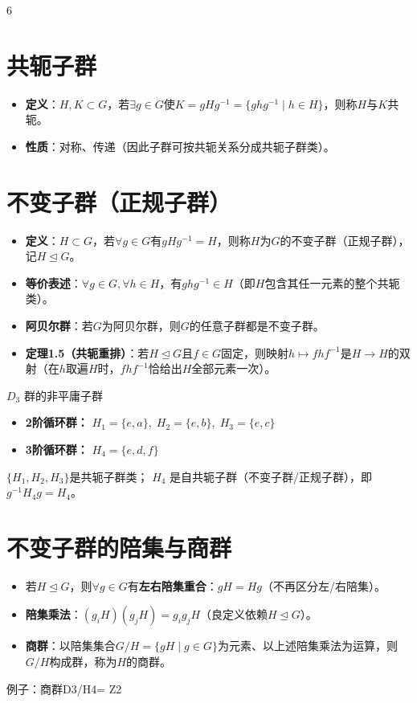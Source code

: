 \documentclass[landscape]{article}
\begin{document}
\begin{multicols*}{6}
\section*{共轭子群}
\begin{itemize}
  \item \textbf{定义}：$H,K\subset G$，若$\exists g\in G$使$K=gHg^{-1}=\{ghg^{-1}\mid h\in H\}$，则称$H$与$K$共轭。
  \item \textbf{性质}：对称、传递（因此子群可按共轭关系分成共轭子群类）。
\end{itemize}

\section*{不变子群（正规子群）}
\begin{itemize}
  \item \textbf{定义}：$H\subset G$，若$\forall g\in G$有$gHg^{-1}=H$，则称$H$为$G$的不变子群（正规子群），记$H\trianglelefteq G$。
  \item \textbf{等价表述}：$\forall g\in G,\forall h\in H$，有$ghg^{-1}\in H$（即$H$包含其任一元素的整个共轭类）。
  \item \textbf{阿贝尔群}：若$G$为阿贝尔群，则$G$的任意子群都是不变子群。
  \item \textbf{定理1.5（共轭重排）}：若$H\trianglelefteq G$且$f\in G$固定，则映射$h\mapsto fhf^{-1}$是$H\to H$的双射（在$h$取遍$H$时，$fhf^{-1}$恰给出$H$全部元素一次）。
\end{itemize}

$D_3$ 群的非平庸子群
\begin{itemize}
    \item \textbf{2阶循环群：} $H_1=\{e, a\},\; H_2=\{e, b\},\; H_3=\{e, c\}$
    \item \textbf{3阶循环群：} $H_4=\{e, d, f\}$
\end{itemize}
$\{H_1, H_2, H_3\}$是共轭子群类；
$H_4$ 是自共轭子群（不变子群/正规子群），即 $g^{-1}H_4 g = H_4$。

\section*{不变子群的陪集与商群}
\begin{itemize}
  \item 若$H\trianglelefteq G$，则$\forall g\in G$有\textbf{左右陪集重合}：$gH=Hg$（不再区分左/右陪集）。
  \item \textbf{陪集乘法}：$(g_iH)(g_jH)=g_ig_jH$（良定义依赖$H\trianglelefteq G$）。
  \item \textbf{商群}：以陪集集合$G/H=\{gH\mid g\in G\}$为元素、以上述陪集乘法为运算，则$G/H$构成群，称为$H$的商群。
\end{itemize}
例子：商群D3/H4= Z2


\end{multicols*}
\end{document}
